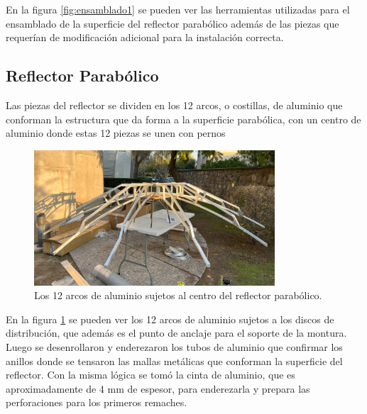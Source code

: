 En la figura \ref{fig:ensamblado1} se pueden ver las herramientas utilizadas para el ensamblado de la superficie del reflector parabólico además de las piezas que requerían de modificación adicional para la instalación correcta.\\

\subsection{Reflector Parabólico}

Las piezas del reflector se dividen en los 12 arcos, o costillas, de aluminio que conforman la estructura que da forma a la superficie parabólica, con un centro de aluminio donde estas 12 piezas se unen con pernos\\

\begin{figure}
    \centering
    \includegraphics[width=0.8\textwidth]{img/estructura1}
    \caption{Los 12 arcos de aluminio sujetos al centro del reflector parabólico.}
    \label{fig:ensamble2}
\end{figure}

En la figura \ref{fig:ensamble2} se pueden ver los 12 arcos de aluminio sujetos a los discos de distribución, que además es el punto de anclaje para el soporte de la montura.\\

Luego se desenrollaron y enderezaron los tubos de aluminio que confirmar los anillos donde se tensaron las mallas metálicas que conforman la superficie del reflector. Con la misma lógica se tomó la cinta de aluminio, que es aproximadamente de 4 mm de espesor, para enderezarla y prepara las perforaciones para los primeros remaches.\\

